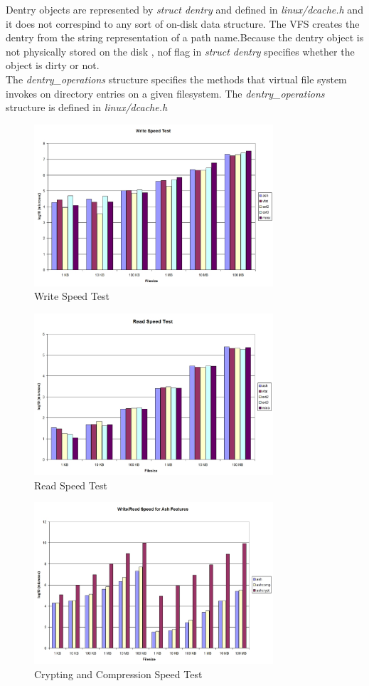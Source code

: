 \documentclass[conference]{IEEEtran}
\begin{document}
Dentry objects are represented by {\em struct dentry} and defined in {\em linux/dcache.h} and it does not 
correspind to any sort of on-disk data structure. The VFS creates the dentry from the string representation of 
a path name.Because the dentry object is not physically stored on the disk , nof flag in {\em struct dentry}
specifies whether the object is dirty or not. \\

The {\em dentry\_operations}  structure specifies the methods that virtual file system invokes on directory entries on a 
given filesystem. The {\em dentry\_operations} structure is defined in {\em linux/dcache.h} 

\begin{figure}[!t]
\centering
\includegraphics[width=3.5in]{writetest.jpg}
\caption{Write Speed Test}
\label{fig_wspeed}
\end{figure}

\begin{figure}[!t]
\centering
\includegraphics[width=3.5in]{readtest.jpg}
\caption{Read Speed Test}
\label{fig_rspeed}
\end{figure}

\begin{figure}[!t]
\centering
\includegraphics[width=3.5in]{features.jpg}
\caption{Crypting and Compression Speed Test}
\label{fig_fspeed}
\end{figure}
\end{document}
